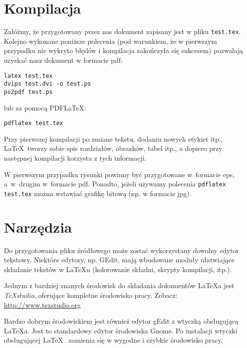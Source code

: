 
\section{Kompilacja}
\label{sec:kompilacja}


Załóżmy, że przygotowany przez nas dokument zapisany jest w pliku \texttt{test.tex}. Kolejno wykonane poniższe polecenia (pod warunkiem, że w pierwszym przypadku nie wykryto błędów i kompilacja zakończyła się sukcesem) pozwalają uzyskać nasz dokument w formacie pdf:
\begin{lstlisting}
latex test.tex
dvips test.dvi -o test.ps
ps2pdf test.ps
\end{lstlisting}
%
lub za pomocą PDF\LaTeX:
\begin{lstlisting}
pdflatex test.tex
\end{lstlisting}

Przy pierwszej kompilacji po zmiane tekstu, dodaniu nowych etykiet itp., \LaTeX~tworzy sobie spis rozdziałów, obrazków, tabel itp., a dopiero przy następnej kompilacji korzysta z tych informacji.

W pierwszym przypadku rysunki powinny być przygotowane w~formacie eps, a~w~drugim w~formacie pdf. Ponadto, jeżeli używamy polecenia \texttt{pdflatex test.tex} można wstawiać grafikę bitową (np. w formacie jpg).




\section{Narzędzia}
\label{sec:narzedzia}


Do przygotowania pliku źródłowego może zostać wykorzystany dowolny edytor tekstowy. Niektóre edytory, np. GEdit, mają wbudowane moduły ułatwiające składanie tekstów w LaTeXu (kolorowanie składni, skrypty kompilacji, itp.).

Jednym z bardziej znanych środowisk do składania dokumentów  \LaTeX a jest {\em TeXstudio}, oferujące kompletne środowisko pracy. Zobacz: \url{http://www.texstudio.org}


Bardzo dobrym środowiskiem jest również edytor gEdit z wtyczką obsługującą \LaTeX a. Jest to standardowy edytor środowiska Gnome. Po instalacji wtyczki obsługującej \LaTeX~ zamienia się w wygodne i szybkie środowisko pracy.

